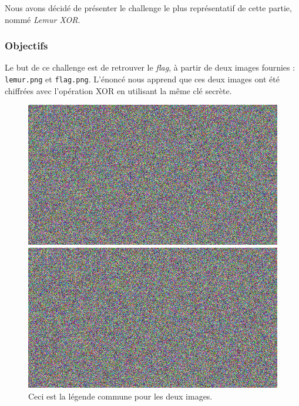 \documentclass[12pt, a4paper]{article}
\begin{document}
    Nous avons décidé de présenter le challenge le plus représentatif de cette
    partie, nommé \textit{Lemur XOR}.

    \subsubsection{Objectifs}
    Le but de ce challenge est de retrouver le \textit{flag}, à partir de deux
    images fournies : \texttt{lemur.png} et \texttt{flag.png}. L'énoncé nous
    apprend que ces deux images ont été chiffrées avec l'opération XOR en
    utilisant la même clé secrète.

    \begin{figure}[htbp] %
        \centering %

        \begin{minipage}{0.48\textwidth}
            \centering
            \includegraphics[width=\linewidth]{Images/Lemur/flag.png}
        \end{minipage}
        \hfill %
        \begin{minipage}{0.48\textwidth}
            \centering
            \includegraphics[width=\linewidth]{Images/Lemur/lemur.png}
        \end{minipage}

        \caption{Ceci est la légende commune pour les deux images.}
        \label{fig:deux-images}
    \end{figure}
\end{document}
